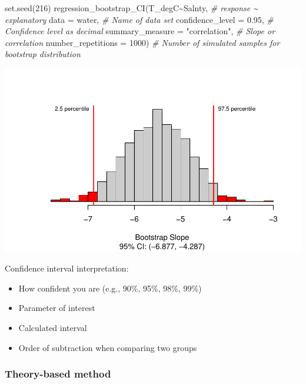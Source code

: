 \documentclass[
]{report}
\newenvironment{Shaded}{\begin{snugshade}}{\end{snugshade}}
\newcommand{\AttributeTok}[1]{\textcolor[rgb]{0.77,0.63,0.00}{#1}}
\newcommand{\CommentTok}[1]{\textcolor[rgb]{0.56,0.35,0.01}{\textit{#1}}}
\newcommand{\DecValTok}[1]{\textcolor[rgb]{0.00,0.00,0.81}{#1}}
\newcommand{\FloatTok}[1]{\textcolor[rgb]{0.00,0.00,0.81}{#1}}
\newcommand{\FunctionTok}[1]{\textcolor[rgb]{0.00,0.00,0.00}{#1}}
\newcommand{\NormalTok}[1]{#1}
\newcommand{\SpecialCharTok}[1]{\textcolor[rgb]{0.00,0.00,0.00}{#1}}
\newcommand{\StringTok}[1]{\textcolor[rgb]{0.31,0.60,0.02}{#1}}
\begin{document}
\begin{Shaded}
\begin{Highlighting}[]
\FunctionTok{set.seed}\NormalTok{(}\DecValTok{216}\NormalTok{)}
\FunctionTok{regression\_bootstrap\_CI}\NormalTok{(T\_degC}\SpecialCharTok{\textasciitilde{}}\NormalTok{Salnty, }\CommentTok{\# response \textasciitilde{} explanatory}
   \AttributeTok{data =}\NormalTok{ water, }\CommentTok{\# Name of data set}
   \AttributeTok{confidence\_level =} \FloatTok{0.95}\NormalTok{, }\CommentTok{\# Confidence level as decimal}
   \AttributeTok{summary\_measure =} \StringTok{"correlation"}\NormalTok{, }\CommentTok{\# Slope or correlation}
   \AttributeTok{number\_repetitions =} \DecValTok{1000}\NormalTok{) }\CommentTok{\# Number of simulated samples for bootstrap distribution}
\end{Highlighting}
\end{Shaded}

\begin{center}\includegraphics[width=0.7\linewidth]{13-LN013-regression_files/figure-latex/unnamed-chunk-15-1} \end{center}

Confidence interval interpretation:

\begin{itemize}
\item
  How confident you are (e.g., 90\%, 95\%, 98\%, 99\%)
\item
  Parameter of interest
\item
  Calculated interval
\item
  Order of subtraction when comparing two groups
\end{itemize}

\vspace{0.8in}

\hypertarget{theory-based-method-7}{%
\subsubsection*{Theory-based method}\label{theory-based-method-7}}
\end{document}
